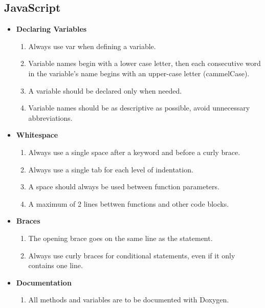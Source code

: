 \documentclass[11pt,a4paper]{article}
\begin{document}
\subsection{JavaScript}
\begin{itemize}
\item \textbf{Declaring Variables}
	\begin{enumerate}
	\item Always use var when defining a variable.
    \item Variable names begin with a lower case letter, then each consecutive word in the variable's name begins with an upper-case letter (cammelCase).
    \item A variable should be declared only when needed.
   	\item Variable names should be as descriptive as possible, avoid unnecessary abbreviations.
	\end{enumerate}
\item \textbf{Whitespace}
	\begin{enumerate}
	\item Always use a single space after a keyword and before a curly brace.
    \item Always use a single tab for each level of indentation.
    \item A space should always be used between function parameters.
    \item A maximum of 2 lines bettwen functions and other code blocks.
	\end{enumerate}
\item \textbf{Braces}
	\begin{enumerate}
	\item The opening brace goes on the same line as the statement.
	\item Always use curly braces for conditional statements, even if it only contains one line.
	\end{enumerate}
\item \textbf{Documentation}
	\begin{enumerate}
	\item All methods and variables are to be documented with Doxygen.
	\end{enumerate}
\end{itemize}
\end{document}
